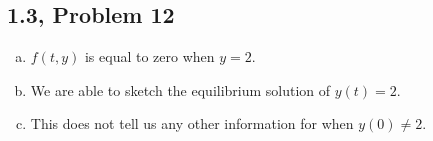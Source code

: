 \documentclass[12pt]{mypackage}
\begin{document}
%
\subsection{1.3, Problem 12}%
\begin{enumerate}[(a)]
  \item $f(t,y)$ is equal to zero when $y = 2$.
  \item We are able to sketch the equilibrium solution of $y(t) = 2$.
  \item This does not tell us any other information for when $y(0) \neq 2$.
\end{enumerate}
\end{document}
